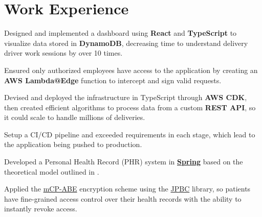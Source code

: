 \documentclass{article}
\begin{document}
\sectionsep

\section{Work Experience}
\begin{bullets}
    \item Designed and implemented a dashboard using \textbf{React} and \textbf{TypeScript} to visualize data stored in \textbf{DynamoDB}, decreasing time to understand delivery driver work sessions by over 10 times.
    \item Ensured only authorized employees have access to the application by creating an \textbf{AWS Lambda@Edge} function to intercept and sign valid requests.
    \item Devised and deployed the infrastructure in TypeScript through \textbf{AWS CDK}, then created efficient algorithms to process data from a custom \textbf{REST API}, so it could scale to handle millions of deliveries.
    \item Setup a CI/CD pipeline and exceeded requirements in each stage, which lead to the application being pushed to production.
\end{bullets}
\sectionsep

\begin{bullets}
    \item Developed a Personal Health Record (PHR) system in \textbf{\href{https://spring.io/}{Spring}} based on the theoretical model outlined in .
    \item Applied the \href{https://link.springer.com/chapter/10.1007/978-3-642-10838-9\_23}{mCP-ABE} encryption scheme using the \href{http://gas.dia.unisa.it/projects/jpbc/}{JPBC} library, so patients have fine-grained access control over their health records with the ability to instantly revoke access.
\end{bullets}
\sectionsep
\end{document}
